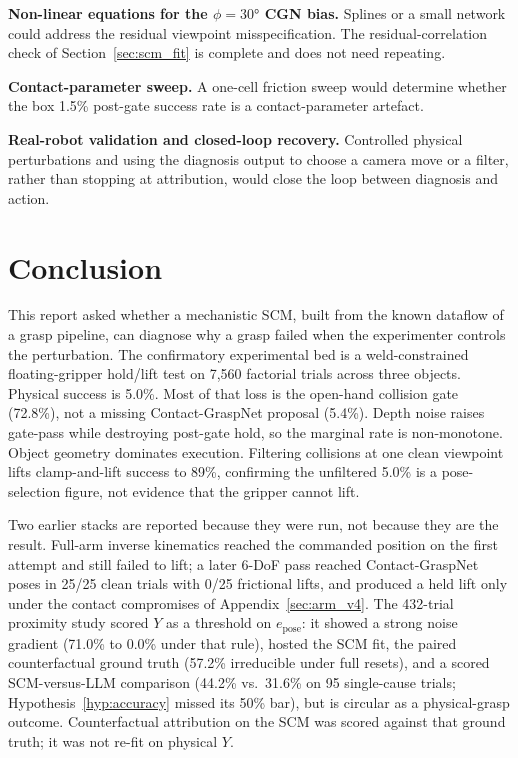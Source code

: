 \documentclass[11pt,a4paper]{report}
\begin{document}
\textbf{Non-linear equations for the $\phi = 30°$ CGN bias.} Splines or a small network could address the residual viewpoint misspecification. The residual-correlation check of Section~\ref{sec:scm_fit} is complete and does not need repeating.

\textbf{Contact-parameter sweep.} A one-cell friction sweep would determine whether the box 1.5\% post-gate success rate is a contact-parameter artefact.

\textbf{Real-robot validation and closed-loop recovery.} Controlled physical perturbations and using the diagnosis output to choose a camera move or a filter, rather than stopping at attribution, would close the loop between diagnosis and action.

\chapter{Conclusion}
\label{ch:conclusion}

This report asked whether a mechanistic SCM, built from the known dataflow of a grasp pipeline, can diagnose why a grasp failed when the experimenter controls the perturbation. The confirmatory experimental bed is a weld-constrained floating-gripper hold/lift test on 7{,}560 factorial trials across three objects. Physical success is 5.0\%. Most of that loss is the open-hand collision gate (72.8\%), not a missing Contact-GraspNet proposal (5.4\%). Depth noise raises gate-pass while destroying post-gate hold, so the marginal rate is non-monotone. Object geometry dominates execution. Filtering collisions at one clean viewpoint lifts clamp-and-lift success to 89\%, confirming the unfiltered 5.0\% is a pose-selection figure, not evidence that the gripper cannot lift.

Two earlier stacks are reported because they were run, not because they are the result. Full-arm inverse kinematics reached the commanded position on the first attempt and still failed to lift; a later 6-DoF pass reached Contact-GraspNet poses in 25/25 clean trials with 0/25 frictional lifts, and produced a held lift only under the contact compromises of Appendix~\ref{sec:arm_v4}. The 432-trial proximity study scored $Y$ as a threshold on $e_{\text{pose}}$: it showed a strong noise gradient (71.0\% to 0.0\% under that rule), hosted the SCM fit, the paired counterfactual ground truth (57.2\% irreducible under full resets), and a scored SCM-versus-LLM comparison (44.2\% vs.\ 31.6\% on 95 single-cause trials; Hypothesis~\ref{hyp:accuracy} missed its 50\% bar), but is circular as a physical-grasp outcome. Counterfactual attribution on the SCM was scored against that ground truth; it was not re-fit on physical $Y$.
\end{document}
